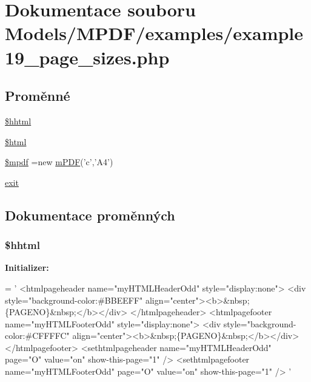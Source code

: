 \hypertarget{example19__page__sizes_8php}{\section{Dokumentace souboru Models/\-M\-P\-D\-F/examples/example19\-\_\-page\-\_\-sizes.php}
\label{example19__page__sizes_8php}
}
\subsection*{Proměnné}
\begin{DoxyCompactItemize}
\item 
\hyperlink{example19__page__sizes_8php_aaacb8c441d18946d942b7c583bd502d1}{\$hhtml}
\item 
\hyperlink{example19__page__sizes_8php_a6f96e7fc92441776c9d1cd3386663b40}{\$html}
\item 
\hyperlink{example19__page__sizes_8php_ad028f81910d6cbab9b184d2214b3a8f8}{\$mpdf} =new \hyperlink{classm_p_d_f}{m\-P\-D\-F}('c','A4')
\item 
\hyperlink{example19__page__sizes_8php_a6733eb5f605d09eaede9845835d71c4e}{exit}
\end{DoxyCompactItemize}


\subsection{Dokumentace proměnných}
\hypertarget{example19__page__sizes_8php_aaacb8c441d18946d942b7c583bd502d1}{
\subsubsection[{\$hhtml}]{\setlength{\rightskip}{0pt plus 5cm}\$hhtml}}\label{example19__page__sizes_8php_aaacb8c441d18946d942b7c583bd502d1}
{\bfseries Initializer\-:}
\begin{DoxyCode}
= \textcolor{stringliteral}{'}
\textcolor{stringliteral}{<htmlpageheader name="myHTMLHeaderOdd" style="display:none">}
\textcolor{stringliteral}{<div style="background-color:#BBEEFF" align="center"><b>&nbsp;\{PAGENO\}&nbsp;</b></div>}
\textcolor{stringliteral}{</htmlpageheader>}
\textcolor{stringliteral}{<htmlpagefooter name="myHTMLFooterOdd" style="display:none">}
\textcolor{stringliteral}{<div style="background-color:#CFFFFC" align="center"><b>&nbsp;\{PAGENO\}&nbsp;</b></div>}
\textcolor{stringliteral}{</htmlpagefooter>}
\textcolor{stringliteral}{<sethtmlpageheader name="myHTMLHeaderOdd" page="O" value="on" show-this-page="1" />}
\textcolor{stringliteral}{<sethtmlpagefooter name="myHTMLFooterOdd" page="O" value="on" show-this-page="1" />}
\textcolor{stringliteral}{'}
\end{DoxyCode}


